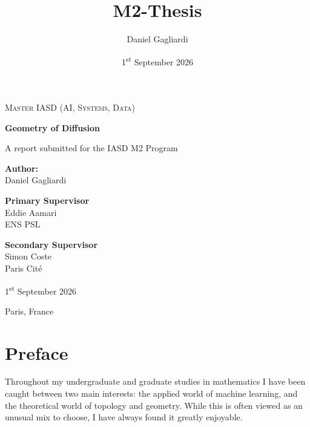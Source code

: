 \documentclass{article}
\title{M2-Thesis}
\author{Daniel Gagliardi}
\date{1\textsuperscript{st} September 2026}
\theoremstyle{plain}
\theoremstyle{definition}
\theoremstyle{remark}
\begin{document}
\begin{titlepage}
    \centering

    
    {\scshape\Large Master IASD (AI, Systems, Data)\par}
    \vspace{1cm}
    
    {\huge\bfseries Geometry of Diffusion\par}
    \vspace{0.5cm}
    {\large A report submitted for the IASD M2 Program\par}
    
    \vspace{2.5cm}
    
    {\large\textbf{Author:}}\\
    {\Large Daniel Gagliardi}\\[1.5cm]
    
    \begin{minipage}{0.45\textwidth}
        \begin{flushleft} \large
            \textbf{Primary Supervisor}\\
            Eddie Aamari \\ ENS PSL
        \end{flushleft}
    \end{minipage}
    \begin{minipage}{0.45\textwidth}
        \begin{flushright} \large
            \textbf{Secondary Supervisor}\\
            Simon Coste \\ Paris Cit\'e
        \end{flushright}
    \end{minipage}
    
    \vfill

    
    {\large 1\textsuperscript{st} September 2026\par}

    {Paris, France}
\end{titlepage}


\newpage
\tableofcontents
\newpage

\section*{Preface}

Throughout my undergraduate and graduate studies in mathematics I have been caught between two main interests: the applied world of machine learning, and the theoretical world of topology and geometry. While this is often viewed as an unusual mix to choose, I have always found it greatly enjoyable.
\end{document}
